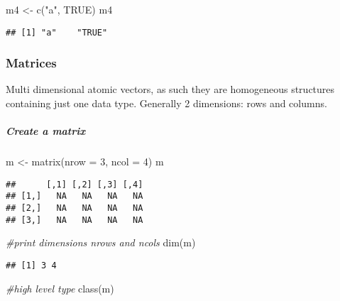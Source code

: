 \documentclass[
]{article}
\newenvironment{Shaded}{\begin{snugshade}}{\end{snugshade}}
\newcommand{\AttributeTok}[1]{\textcolor[rgb]{0.77,0.63,0.00}{#1}}
\newcommand{\CommentTok}[1]{\textcolor[rgb]{0.56,0.35,0.01}{\textit{#1}}}
\newcommand{\ConstantTok}[1]{\textcolor[rgb]{0.00,0.00,0.00}{#1}}
\newcommand{\DecValTok}[1]{\textcolor[rgb]{0.00,0.00,0.81}{#1}}
\newcommand{\FunctionTok}[1]{\textcolor[rgb]{0.00,0.00,0.00}{#1}}
\newcommand{\NormalTok}[1]{#1}
\newcommand{\OtherTok}[1]{\textcolor[rgb]{0.56,0.35,0.01}{#1}}
\newcommand{\StringTok}[1]{\textcolor[rgb]{0.31,0.60,0.02}{#1}}
\begin{document}
\begin{Shaded}
\begin{Highlighting}[]
\NormalTok{m4 }\OtherTok{\textless{}{-}} \FunctionTok{c}\NormalTok{(}\StringTok{"a"}\NormalTok{, }\ConstantTok{TRUE}\NormalTok{)}
\NormalTok{m4}
\end{Highlighting}
\end{Shaded}

\begin{verbatim}
## [1] "a"    "TRUE"
\end{verbatim}

\hypertarget{matrices}{%
\subsubsection{Matrices}\label{matrices}}

Multi dimensional atomic vectors, as such they are homogeneous
structures containing just one data type. Generally 2 dimensions: rows
and columns.

\hypertarget{create-a-matrix}{%
\subparagraph{Create a matrix}\label{create-a-matrix}}

\begin{Shaded}
\begin{Highlighting}[]
\NormalTok{m }\OtherTok{\textless{}{-}} \FunctionTok{matrix}\NormalTok{(}\AttributeTok{nrow =} \DecValTok{3}\NormalTok{, }\AttributeTok{ncol =} \DecValTok{4}\NormalTok{)}
\NormalTok{m}
\end{Highlighting}
\end{Shaded}

\begin{verbatim}
##      [,1] [,2] [,3] [,4]
## [1,]   NA   NA   NA   NA
## [2,]   NA   NA   NA   NA
## [3,]   NA   NA   NA   NA
\end{verbatim}

\begin{Shaded}
\begin{Highlighting}[]
\CommentTok{\#print dimensions nrows and ncols}
\FunctionTok{dim}\NormalTok{(m)}
\end{Highlighting}
\end{Shaded}

\begin{verbatim}
## [1] 3 4
\end{verbatim}

\begin{Shaded}
\begin{Highlighting}[]
\CommentTok{\#high level type}
\FunctionTok{class}\NormalTok{(m)}
\end{Highlighting}
\end{Shaded}
\end{document}

